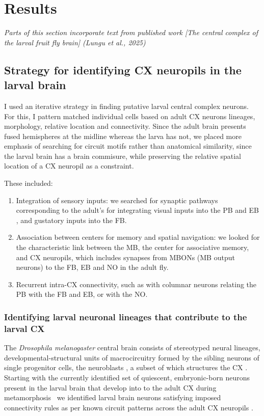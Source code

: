 
\chapter{Results}
\textit{Parts of this section incorporate text from published work [The central complex of the larval fruit fly brain] (Lungu et al., 2025)}


\section{Strategy for identifying CX neuropils in the larval brain}

    I used an iterative strategy in finding putative larval central complex neurons. For this, I pattern matched individual cells based on adult CX neurons lineages, morphology, relative location and connectivity. %
    Since the adult brain presents fused hemispheres at the midline whereas the larva has not, we placed more emphasis of searching for circuit motifs rather than anatomical similarity, since the larval brain has a brain commisure, while preserving the relative spatial location of a CX neuropil as a constraint.

    These included:
    \begin{enumerate}
    \item Integration of sensory inputs: we searched for synaptic pathways corresponding to the adult's for integrating visual inputs into the PB and EB \citep{hulse2021connectome}, and gustatory inputs into the FB.
    \item Association between centers for memory and spatial navigation: we looked for the characteristic link between the MB, the center for associative memory, and CX neuropils, which includes synapses from MBONs (MB output neurons) to the FB, EB and NO in the adult fly.
    \item Recurrent intra-CX connectivity, such as with columnar neurons relating the PB with the FB and EB, or with the NO.
    \end{enumerate}
    
    \subsection{Identifying larval neuronal lineages that contribute to the larval CX}
    The \textit{Drosophila melanogaster} central brain consists of stereotyped neural lineages, developmental-structural units of macrocircuitry formed by the sibling neurons of single progenitor cells, the neuroblasts \citep{Spindler2010Lineages}, a subset of which structures the CX \citep{Pereanu2011LineagesCX}.
    Starting with the currently identified set of quiescent, embryonic-born neurons present in the larval brain that develop into to the adult CX during metamorphosis~\citep{andrade2019developmentally}
    we identified larval brain neurons satisfying imposed connectivity rules as per known circuit patterns across the adult CX neuropils \citep{wolff2015neuroarchitecture, wolff2018neuroarchitecture, franconville2018building, hulse2021connectome}.

